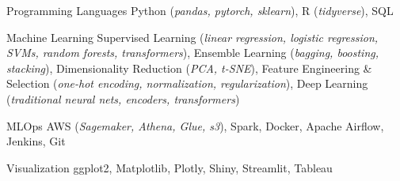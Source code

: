 

\begin{cvskills}

  \cvskill
    {Programming Languages}
    {Python (\small\textit{pandas, pytorch, sklearn}), R (\small\textit{tidyverse}), SQL}

  \cvskill
    {Machine Learning}
    {
      Supervised Learning (\small\textit{linear regression, logistic regression, SVMs, random forests, transformers}), 
      Ensemble Learning (\small\textit{bagging, boosting, stacking}), 
      Dimensionality Reduction (\small\textit{PCA, t-SNE}), 
      Feature Engineering \& Selection (\small\textit{one-hot encoding, normalization, regularization}),
      Deep Learning (\small\textit{traditional neural nets, encoders, transformers})
    }

  \cvskill
    {MLOps}
    {AWS (\small\textit{Sagemaker, Athena, Glue, s3}), Spark, Docker, Apache Airflow, Jenkins, Git}

  \cvskill
    {Visualization}
    {ggplot2, Matplotlib, Plotly, Shiny, Streamlit, Tableau}

  

\end{cvskills}
